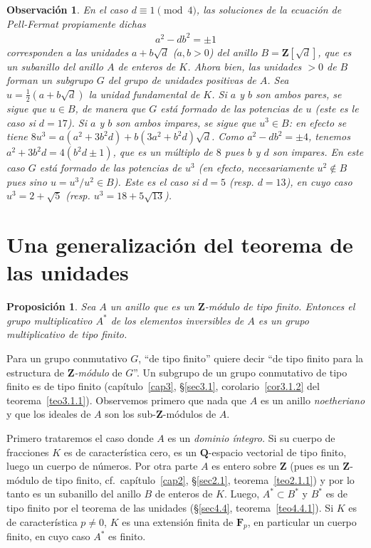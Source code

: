 \documentclass[bibtotoc,leqno,spanish]{amsbook}
\newcommand{\QQ}{\mathbf{Q}}
\newcommand{\ZZ}{\mathbf{Z}}
\newcommand{\FF}{\mathbf{F}}
\numberwithin{equation}{section}
\newenvironment{comm}%
	{\begin{quotation}\itshape}
	{\end{quotation}}
\theoremstyle{note}
\theoremstyle{note}
\newtheorem{proposition}{Proposici\'on}
\theoremstyle{rem}
\newtheorem*{remark*}{Observaci\'on}
\numberwithin{theorem}{section}
\numberwithin{proposition}{section}
\numberwithin{definition}{section}
\numberwithin{lemma}{section}
\numberwithin{corollary}{section}
\numberwithin{example}{section}
\numberwithin{footnote}{section}%
\begin{document}
\begin{remark*}
En el caso $d\equiv 1\pmod 4$, las soluciones de la ecuaci\'on de Pell-Fermat propiamente dichas
\begin{gather}
a^{2}-db^{2}=\pm 1
\end{gather}
corresponden a las unidades $a+b\sqrt{d}$ ($a,b>0$) del anillo $B=\ZZ[\sqrt{d}]$, que es un subanillo
del anillo $A$ de enteros de $K$. Ahora bien, las unidades $>0$ de $B$ forman un subgrupo $G$ del grupo de
unidades positivas de $A$. Sea $u=\frac{1}{2}(a+b\sqrt{d})$ la unidad fundamental de $K$. Si $a$ y $b$ son
ambos {\em pares,} se sigue que $u\in B$, de manera que $G$ {\em est\'a formado de las potencias de $u$} (este
es le caso si $d=17$). Si $a$ y $b$ son ambos {\em impares, se sigue que $u^{3}\in B$:} en efecto se
tiene $8u^{3}=a(a^{2}+3b^{2}d)+b(3a^{2}+b^{2}d)\sqrt{d}$. Como $a^{2}-db^{2}=\pm 4$, tenemos
$a^{2}+3b^{2}d=4(b^{2}d\pm 1)$, que es un m\'ultiplo de $8$ pues $b$ y $d$ son impares. En este caso $G$
{\em est\'a formado de las potencias de $u^{3}$} (en efecto, necesariamente $u^{2}\notin B$ pues sino
$u=u^{3}/u^{2}\in B$). Este es el caso si $d=5$ (resp. $d=13$), en cuyo caso $u^{3}=2+\sqrt{5}$
(resp. $u^{3}=18+5\sqrt{13}$).
\end{remark*}

\section{Una generalizaci\'on del teorema de las unidades}

\begin{proposition}
Sea $A$ un anillo que es un $\ZZ$-m\'odulo de tipo finito. Entonces el grupo multiplicativo
$A^{*}$ de los elementos inversibles de $A$ es un grupo multiplicativo de tipo finito.
\end{proposition}

Para un grupo conmutativo $G$, ``de tipo finito'' quiere decir ``de tipo finito para la estructura
de {\em $\ZZ$-m\'odulo} de $G$''. Un subgrupo de un grupo conmutativo de tipo finito es de tipo finito
(cap\'itulo~\ref{cap3}, \S\ref{sec3.1}, corolario~\ref{cor3.1.2} del teorema~\ref{teo3.1.1}).
Observemos primero que nada que $A$ es un anillo {\em noetheriano}
y que los ideales de $A$ son los sub-$\ZZ$-m\'odulos de $A$.

Primero trataremos el caso donde $A$ es un {\em dominio \'integro.} Si su cuerpo de fracciones $K$ es
de caracter\'istica cero, es un $\QQ$-espacio vectorial de tipo finito, luego un cuerpo de n\'umeros.
Por otra parte $A$ es entero sobre $\ZZ$ (pues es un $\ZZ$-m\'odulo de tipo finito,
cf.~cap\'itulo~\ref{cap2}, \S\ref{sec2.1}, teorema~\ref{teo2.1.1})
y por lo tanto es un subanillo del anillo $B$ de enteros de $K$. Luego, $A^{*}\subset B^{*}$ y $B^{*}$ es
de tipo finito por el teorema de las unidades (\S\ref{sec4.4}, teorema~\ref{teo4.4.1}). Si $K$ es de caracter\'istica $p\neq 0$, $K$
es una extensi\'on finita de $\FF_{p}$, en particular un cuerpo finito, en cuyo caso $A^{*}$ es finito.
\end{document}
